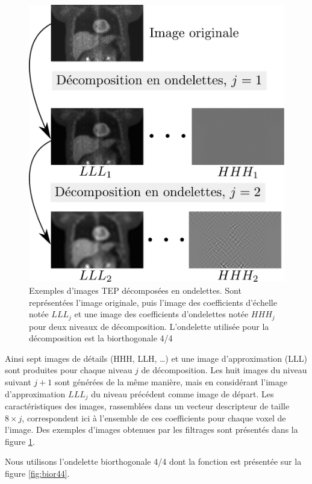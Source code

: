 \begin{figure}
 \centering
 \includegraphics[width=15cm]{images/exemplesDecomp}
 \caption[Exemples de décomposition d'images en ondelettes]{Exemples d'images TEP décomposées en ondelettes. Sont représentées l'image originale, puis l'image des coefficients d'échelle notée $LLL_j$ et une image des coefficients d'ondelettes notée $HHH_j$ pour deux niveaux de décomposition. L'ondelette utilisée pour la décomposition est la biorthogonale 4/4}
 \label{fig:bior44Ex}
\end{figure}


Ainsi sept images de détails (HHH, LLH, \dots) et une image d’approximation (LLL) sont produites pour chaque niveau $j$ de décomposition. Les huit images du niveau suivant $j+1$ sont générées de la même manière, mais en considérant l’image d’approximation $LLL_j$ du niveau précédent comme image de départ. Les caractéristiques des images, rassemblées dans un vecteur descripteur de taille $8 \times j$, correspondent ici à l’ensemble de ces coefficients pour chaque voxel  de l’image. Des exemples d'images obtenues par les filtrages sont présentés dans la figure \ref{fig:bior44Ex}.

Nous utilisons l'ondelette biorthogonale 4/4 dont la fonction est présentée sur la figure \ref{fig:bior44}.


